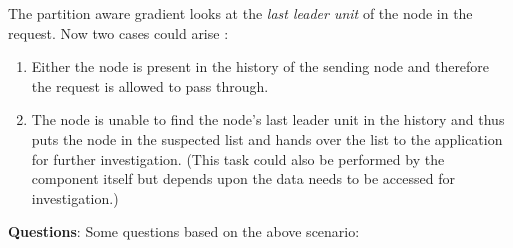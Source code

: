 \documentclass[a4paper, 11pt]{article}
\begin{document}
The partition aware gradient looks at the \textit{last leader unit} of the node in the request. Now two cases could arise :

\begin{enumerate}

\item Either the node is present in the history of the sending node and therefore the request is allowed to pass through.

\item The node is unable to find the node's last leader unit in the history and thus puts the node in the suspected list and hands over the list to the application for further investigation. (This task could also be performed by the component itself but depends upon the data needs to be accessed for investigation.)


\end{enumerate}


\textbf{Questions}: Some questions based on the above scenario:
\end{document}
